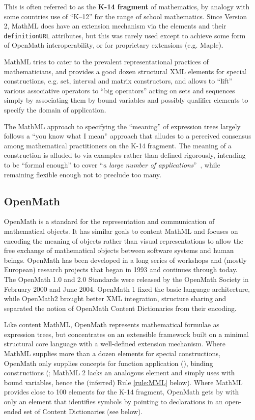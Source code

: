 \documentclass{llncs}
\begin{document}
This is often referred to as the {\textbf{K-14 fragment}} of mathematics, by
analogy with some countries use of ``K--12'' for the range of school mathematics. Since Version 2,
MathML does have an extension mechanism via the {} elements and their
{\texttt{definitionURL}} attributes, but this was rarely used except to achieve some form of OpenMath interoperability, or for proprietary extensions (e.g. Maple).

MathML tries to cater to the prevalent representational practices of mathematicians, and
provides a good dozen structural XML elements for special constructions, e.g. set,
interval and matrix constructors, and allows to ``lift'' various associative operators to
``big operators'' acting on sets and sequences simply by associating them by bound
variables and possibly qualifier elements to specify the domain of application.

The MathML approach to specifying the ``meaning'' of expression trees largely follows a
``you know what I mean'' approach that alludes to a perceived consensus among mathematical
practitioners on the K-14 fragment. The meaning of a construction is alluded to via
examples rather than defined rigorously, intending to be ``formal enough'' to cover
``{\emph{a large number of applications}}''~\cite[4.1.2]{WorldWideWebConsortium2003b},
while remaining flexible enough not to preclude too many.

\subsection{OpenMath}\label{sec:openmath}

OpenMath \cite{OpenMath2004a} is a standard for the representation and communication of mathematical objects.
It has similar goals to content MathML and focuses on encoding the meaning of objects
rather than visual representations to allow the free exchange of mathematical objects
between software systems and human beings. OpenMath has been developed in a long series of
workshops and (mostly European) research projects that began in 1993 and continues through
today. The OpenMath 1.0 and 2.0 Standards were released by the OpenMath Society in
February 2000 and June 2004. OpenMath 1 fixed the basic language architecture, while
OpenMath2 brought better XML integration, structure sharing and separated the notion of OpenMath Content Dictionaries from their encoding.

Like content MathML, OpenMath represents mathematical formulae as expression trees, but
concentrates on an extensible framework built on a minimal structural core language with a
well-defined extension mechanism. Where MathML supplies more than a dozen elements for
special constructions, OpenMath only supplies concepts for function application
({}), binding constructions ({}; MathML 2 lacks an analogous
element and simply uses {} with bound variables, hence the
(inferred) Rule \ref{rule:MML} below). Where MathML provides
close to 100 elements for the K-14 fragment, OpenMath gets by with only an {}
element that identifies symbols by pointing to declarations in an open-ended set of
Content Dictionaries (see below). 
\end{document}
